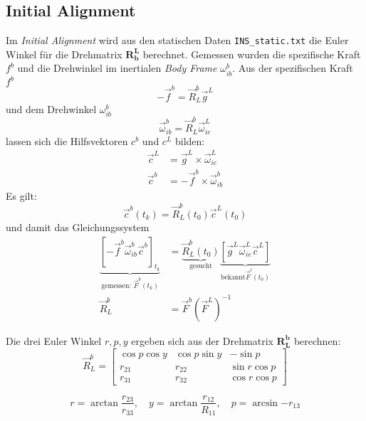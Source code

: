 
\subsection{Initial Alignment}

Im \textit{Initial Alignment} wird aus den statischen Daten {\tt INS\_static.txt} die Euler Winkel für die Drehmatrix $\mathbf{R_b^L}$ berechnet. Gemessen wurden die spezifische Kraft $f^b$ und die Drehwinkel im inertialen \textit{Body Frame} $\omega_{ib}^b$. Aus der spezifischen Kraft $f^b$
\begin{equation}
 	-\vec{f}^b = \vec{R}_L^b \vec{g}^L
\end{equation}
und dem Drehwinkel $\omega_{ib}^b$
\begin{equation}
 	\vec{\omega}_{ib}^b = \vec{R}_L^b \vec{\omega}_{ie}^L
\end{equation}
lassen sich die Hilfsvektoren $c^b$ und $c^L$ bilden:
\begin{align}
 	\vec{c}^L &= \vec{g}^L \times \vec{\omega}_{ie}^L\\
	 \vec{c}^b &= -\vec{f}^b \times \vec{\omega}_{ib}^b
\end{align}
Es gilt:
\begin{equation}
 	\vec{c}^b(t_k) = \vec{R}_L^b(t_0)\vec{c}^L(t_0)
\end{equation}
und damit das Gleichungssystem
\begin{align}
 	\underbrace{\left[ -\vec{f}^b \vec{\omega}_{ib}^b \vec{c}^b \right]_{t_k}}_{\text{gemessen: }\vec{F}^b(t_k)}& = \underbrace{\vec{R}_L^b(t_0)}_{\text{gesucht}} \underbrace{\left[ \vec{g}^L  \vec{\omega}_{ie}^L \vec{c}^L \right]}_{\text{bekannt} \vec{F}^l(t_0)}\\
	\vec{R}_L^b &= \vec{F}^b \left( \vec{F}^L \right)^{-1}
\end{align}

Die drei Euler Winkel $r, p , y$ ergeben sich aus der Drehmatrix $\mathbf{R_L^b}$ berechnen:
\begin{equation}\label{eq:r_lb}
	\vec{R}_L^b =
	\begin{bmatrix}
		\cos p \cos y & \cos p \sin y & -\sin p\\
		r_{21} & r_{22} & \sin r \cos p\\
		r_{31} & r_{32} & \cos r \cos p
	\end{bmatrix}
\end{equation}

\begin{equation}
 	r = \arctan{\frac{r_{23}}{r_{33}}}, \quad y = \arctan{\frac{r_{12}}{R_{11}}},\quad p = \arcsin{-r_{13}}
\end{equation}

